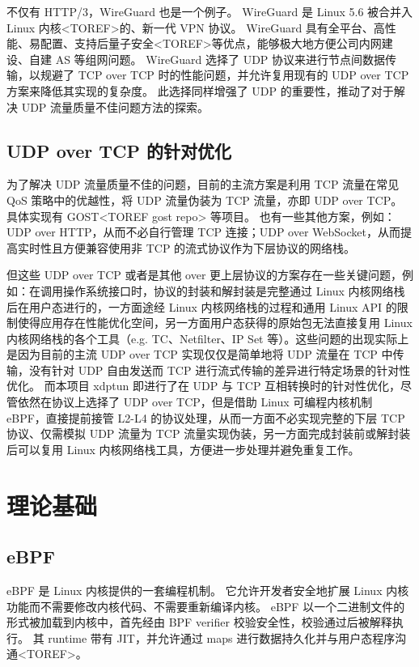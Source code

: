 不仅有 HTTP/3，WireGuard 也是一个例子。
WireGuard 是 Linux 5.6 被合并入 Linux 内核<TOREF>的、新一代 VPN 协议。
WireGuard 具有全平台、高性能、易配置、支持后量子安全<TOREF>等优点，能够极大地方便公司内网建设、自建 AS 等组网问题。
WireGuard 选择了 UDP 协议来进行节点间数据传输，以规避了 TCP over TCP 时的性能问题，并允许复用现有的 UDP over TCP 方案来降低其实现的复杂度。
此选择同样增强了 UDP 的重要性，推动了对于解决 UDP 流量质量不佳问题方法的探索。

\section{UDP over TCP 的针对优化}

为了解决 UDP 流量质量不佳的问题，目前的主流方案是利用 TCP 流量在常见 QoS 策略中的优越性，将 UDP 流量伪装为 TCP 流量，亦即 UDP over TCP。
具体实现有 GOST<TOREF gost repo> 等项目。
也有一些其他方案，例如：UDP over HTTP，从而不必自行管理 TCP 连接；UDP over WebSocket，从而提高实时性且方便兼容使用非 TCP 的流式协议作为下层协议的网络栈。

但这些 UDP over TCP 或者是其他 over 更上层协议的方案存在一些关键问题，例如：在调用操作系统接口时，协议的封装和解封装是完整通过 Linux 内核网络栈后在用户态进行的，一方面途经 Linux 内核网络栈的过程和通用 Linux API 的限制使得应用存在性能优化空间，另一方面用户态获得的原始包无法直接复用 Linux 内核网络栈的各个工具（e.g. TC、Netfilter、IP Set 等）。这些问题的出现实际上是因为目前的主流 UDP over TCP 实现仅仅是简单地将 UDP 流量在 TCP 中传输，没有针对 UDP 自由发送而 TCP 进行流式传输的差异进行特定场景的针对性优化。
而本项目 xdptun 即进行了在 UDP 与 TCP 互相转换时的针对性优化，尽管依然在协议上选择了 UDP over TCP，但是借助 Linux 可编程内核机制 eBPF，直接提前接管 L2-L4 的协议处理，从而一方面不必实现完整的下层 TCP 协议、仅需模拟 UDP 流量为 TCP 流量实现伪装，另一方面完成封装前或解封装后可以复用 Linux 内核网络栈工具，方便进一步处理并避免重复工作。

\chapter{理论基础}

\section{eBPF}

eBPF 是 Linux 内核提供的一套编程机制。
它允许开发者安全地扩展 Linux 内核功能而不需要修改内核代码、不需要重新编译内核。
eBPF 以一个二进制文件的形式被加载到内核中，首先经由 BPF verifier 校验安全性，校验通过后被解释执行。
其 runtime 带有 JIT，并允许通过 maps 进行数据持久化并与用户态程序沟通<TOREF>。

